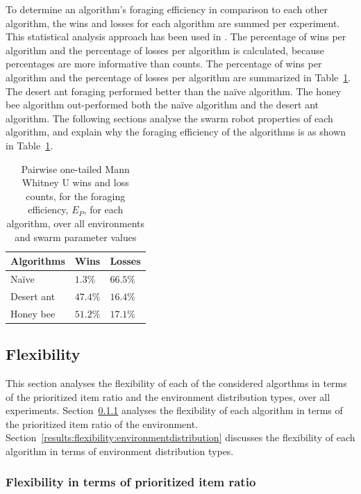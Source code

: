 \documentclass[preprint,12pt]{elsarticle}
\begin{document}
To determine an algorithm's foraging efficiency in comparison to each other algorithm, the wins and losses for each algorithm are summed per experiment. This statistical analysis approach has been used in \cite{helbig2013performance}. The percentage of wins per algorithm and the percentage of losses per algorithm is calculated, because percentages are more informative than counts. The percentage of wins per algorithm and the percentage of losses per algorithm are summarized in Table~\ref{summarytable}. The desert ant foraging performed better than the na\"ive algorithm. The honey bee algorithm out-performed both the na\"ive algorithm and the desert ant algorithm. The following sections analyse the swarm robot properties of each algorithm, and explain why the foraging efficiency of the algorithms is as shown in Table~\ref{summarytable}.


\begin{table}[!htbp]
    \centering
    \caption{Pairwise one-tailed Mann Whitney U wins and loss counts, for the foraging efficiency, $E_P$, for each algorithm, over all environments and swarm parameter values }
    \label{summarytable}
    \begin{tabular}{@{}lll@{}}
    \toprule
    \textbf{Algorithms} & \textbf{Wins} & \textbf{Losses} \\ \midrule
    Na\"ive               & $1.3\%$          & $66.5\%$           \\
    Desert ant          & $47.4\%$         & $16.4\%$           \\
    Honey bee           & $51.2\%$         & $17.1\%$          \\ \bottomrule
    \end{tabular}
\end{table}


\subsection{Flexibility}
\label{results:flexibility}

This section analyses the flexibility of each of the considered algorthms in terms of the prioritized item ratio and the environment distribution types, over all experiments. Section~\ref{results:prioritizeditemratio} analyses the flexibility of each algorithm in terms of the prioritized item ratio of the environment. Section~\ref{results:flexibility:environmentdistribution} discusses the flexibility of each algorithm in terms of environment distribution types.
\subsubsection{Flexibility in terms of prioritized item ratio}
\label{results:prioritizeditemratio}
\end{document}
